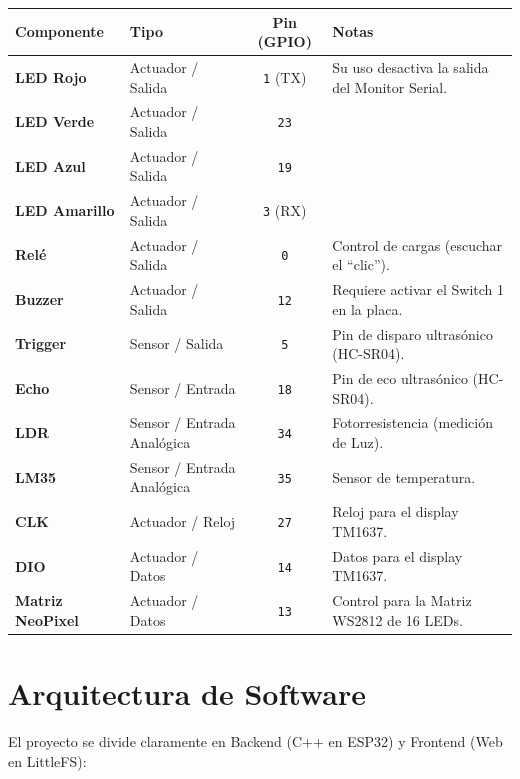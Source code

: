 \documentclass[12pt,a4paper]{article}
\begin{document}
\vspace{0.5cm}
\noindent
\begin{table}[h]
\centering
\begin{tabularx}{\textwidth}{llcX}
\toprule
\textbf{Componente} & \textbf{Tipo} & \textbf{Pin (GPIO)} & \textbf{Notas} \\
\midrule
\textbf{LED Rojo} & Actuador / Salida & \texttt{1} (TX) & Su uso desactiva la salida del Monitor Serial. \\
\textbf{LED Verde} & Actuador / Salida & \texttt{23} & \\
\textbf{LED Azul} & Actuador / Salida & \texttt{19} & \\
\textbf{LED Amarillo} & Actuador / Salida & \texttt{3} (RX) & \\
\textbf{Relé} & Actuador / Salida & \texttt{0} & Control de cargas (escuchar el ``clic''). \\
\textbf{Buzzer} & Actuador / Salida & \texttt{12} & Requiere activar el Switch 1 en la placa. \\
\textbf{Trigger} & Sensor / Salida & \texttt{5} & Pin de disparo ultrasónico (HC-SR04). \\
\textbf{Echo} & Sensor / Entrada & \texttt{18} & Pin de eco ultrasónico (HC-SR04). \\
\textbf{LDR} & Sensor / Entrada Analógica & \texttt{34} & Fotorresistencia (medición de Luz). \\
\textbf{LM35} & Sensor / Entrada Analógica & \texttt{35} & Sensor de temperatura. \\
\textbf{CLK} & Actuador / Reloj & \texttt{27} & Reloj para el display TM1637. \\
\textbf{DIO} & Actuador / Datos & \texttt{14} & Datos para el display TM1637. \\
\textbf{Matriz NeoPixel} & Actuador / Datos & \texttt{13} & Control para la Matriz WS2812 de 16 LEDs. \\
\bottomrule
\end{tabularx}
\end{table}

\section{Arquitectura de Software}

El proyecto se divide claramente en Backend (C++ en ESP32) y Frontend (Web en LittleFS):
\end{document}
